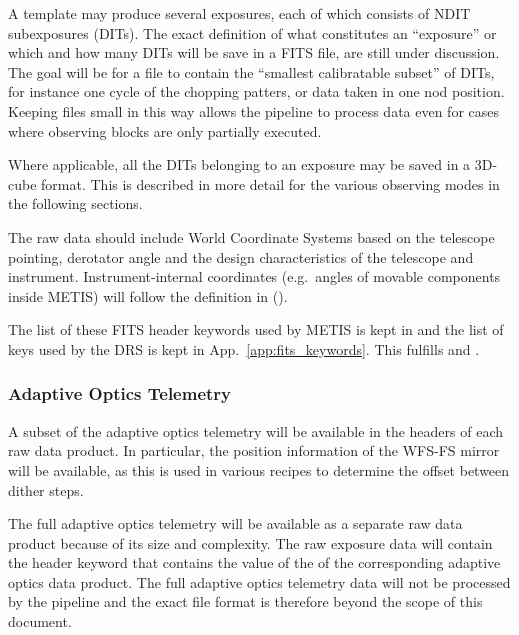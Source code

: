 A template may produce several exposures, each of which consists of
NDIT subexposures (DITs). The exact definition of what constitutes an
``exposure'' or which and how many DITs will be save in a FITS file,
are still under discussion. The goal will be for a file to contain the
``smallest calibratable subset'' of DITs, for instance one cycle of
the chopping patters, or data taken in one nod position. Keeping files
small in this way allows the pipeline to process data even for cases
where observing blocks are only partially executed.

Where applicable, all the DITs belonging to an exposure may be saved
in a 3D-cube format. This is described in more detail for the various
observing modes in the following sections.

The raw data should include World Coordinate Systems based on the
telescope pointing, derotator angle and the design characteristics of
the telescope and instrument. Instrument-internal coordinates
(e.g.~angles of movable components inside METIS) will follow the
definition in \cite{METIS-coordinates} ().

The list of these FITS header keywords used by METIS is kept in
\cite{METIS-DID} and the list of keys used by the \acs{DRS} is kept in App.~\ref{app:fits_keywords}. This fulfills  and .


\subsubsection{Adaptive Optics Telemetry}
A subset of the adaptive optics telemetry will be available in the headers of each raw data product.
In particular, the position information of the \ac{WFS-FS} mirror will be available, as this is used in various recipes to determine the offset between dither steps.

The full adaptive optics telemetry will be available as a separate raw data product because of its size and complexity.
The raw exposure data will contain the  header keyword that contains the value of the  of the corresponding adaptive optics data product.
The full adaptive optics telemetry data will not be processed by the pipeline and the exact file format is therefore beyond the scope of this document.


